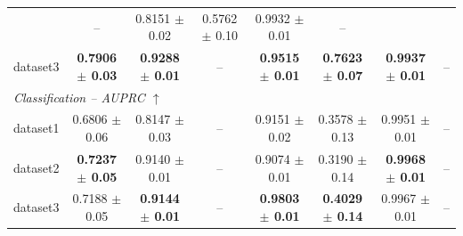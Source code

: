 \documentclass[fleqn,10pt]{wlscirep}
\begin{document}
\begin{appendices}
\begin{table}[p]
{\begin{tabular}{lccccccc}
& --
& 0.8151 $\pm$ 0.02
& 0.5762 $\pm$ 0.10
& 0.9932 $\pm$ 0.01
& -- \\
dataset3
& \textbf{0.7906 $\pm$ 0.03}
& \textbf{0.9288 $\pm$ 0.01}
& --
& \textbf{0.9515 $\pm$ 0.01}
& \textbf{0.7623 $\pm$ 0.07}
& \textbf{0.9937 $\pm$ 0.01}
& -- \\
\midrule
\multicolumn{8}{l}{\textit{Classification -- AUPRC $\uparrow$}} \\
\midrule
dataset1
& 0.6806 $\pm$ 0.06
& 0.8147 $\pm$ 0.03
& --
& 0.9151 $\pm$ 0.02
& 0.3578 $\pm$ 0.13
& 0.9951 $\pm$ 0.01
& -- \\
dataset2
& \textbf{0.7237 $\pm$ 0.05}
& 0.9140 $\pm$ 0.01
& --
& 0.9074 $\pm$ 0.01
& 0.3190 $\pm$ 0.14
& \textbf{0.9968 $\pm$ 0.01}
& -- \\
dataset3
& 0.7188 $\pm$ 0.05
& \textbf{0.9144 $\pm$ 0.01}
& --
& \textbf{0.9803 $\pm$ 0.01}
& \textbf{0.4029 $\pm$ 0.14}
& 0.9967 $\pm$ 0.01
& -- \\
\bottomrule
\end{tabular}%
}
\end{table}
\clearpage


\clearpage

\begin{table}[p]
\centering
\caption{Performance of preprocessing and executor tools in ThyroidXAgent. Held-out test results are reported for preprocessing tools, including image normalization, nodule-presence triage and anatomical-context parsing, and for executor-stage tools, including measurement support, gland localization, lymph-node screening, gland captioning and nodule-feature extraction. Data sources included SMU-HMC single and longitudinal examinations; TN3K, TN5K and ThyroidXL for nodule-presence detection; KMVE and a private region-annotation set for anatomical-context parsing; and TGVideo for spacing prediction. Anatomical-context parsing and nodule-feature extraction are additionally reported at the class level. For the binary margin and shape classifiers, AUROC and AUPRC are reported once across the paired class rows. AP, average precision; MAE, mean absolute error; MSE, mean squared error; MAPE, mean absolute percentage error.}
\label{tab:auxiliary_tools}
\scriptsize
\setlength{\tabcolsep}{2.3pt}
\renewcommand{\arraystretch}{1.08}

\end{table}
\end{appendices}
\end{document}
